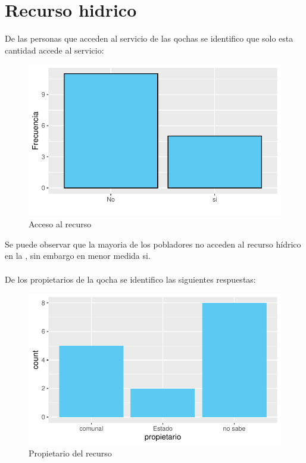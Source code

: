 \documentclass[12pt]{article}\usepackage[]{graphicx}\usepackage[]{xcolor}
\makeatletter
\def\maxwidth{ %
  \ifdim\Gin@nat@width>\linewidth
    \linewidth
  \else
    \Gin@nat@width
  \fi
}
\newenvironment{knitrout}{}{} %
\makeatother
\begin{document}
	\section{Recurso hidrico}
	De las personas que acceden al servicio de las qochas se identifico que solo esta cantidad accede al servicio:
	\begin{figure}[H]
	\centering
\begin{knitrout}
\color{fgcolor}
\includegraphics[width=\maxwidth]{figure/trece-1} 
\end{knitrout}
	\caption{Acceso al recurso}
	\end{figure}
	Se puede observar que la mayoria de los pobladores no acceden al recurso hídrico en la \comunidad, sin embargo en menor medida si.\\
	\\
	De los propietarios de la qocha se identifico las siguientes respuestas:
	\begin{figure}[H]
	\centering
\begin{knitrout}
\color{fgcolor}
\includegraphics[width=\maxwidth]{figure/catorce-1} 
\end{knitrout}
	\caption{Propietario del recurso}
	\end{figure}
\end{document}
